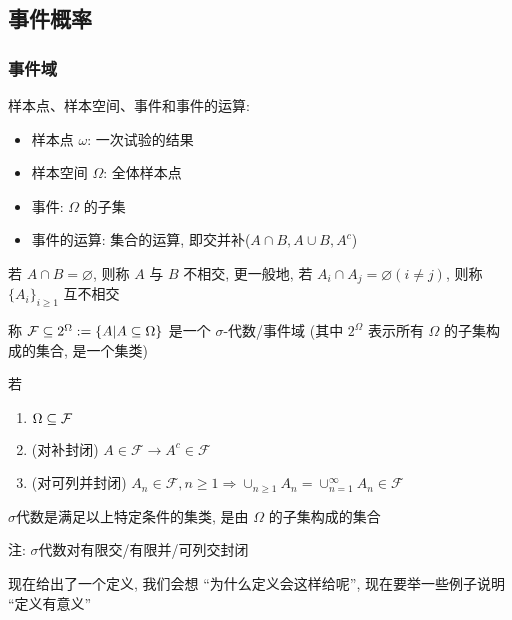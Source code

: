 \subsection{事件概率}

\subsubsection{事件域}

\begin{definition}[样本空间、事件]
    样本点、样本空间、事件和事件的运算: 
    \begin{itemize}
        \item 样本点 $\omega$:  一次试验的结果
        \item 样本空间 $\Omega$:  全体样本点
        \item 事件: $\Omega$ 的子集
        \item 事件的运算: 集合的运算, 即交并补($A\cap B, A\cup B, A^c$)
    \end{itemize}
\end{definition}

\begin{definition}
    若 $A\cap B=\varnothing$, 则称 $A$ 与 $B$ 不相交, 更一般地, 若 $A_i\cap A_j=\varnothing (i\neq j)$, 则称 $\{A_i\}_{i\geq 1}$ 互不相交
\end{definition}

\begin{definition}[$\sigma$-代数]
    称 $\mathcal{F}\subseteq 2^{\Omega}:=\{A|A\subseteq \Omega\}$ 是一个 $\sigma$-代数/事件域 (其中 $2^{\Omega}$ 表示所有 $\Omega$ 的子集构成的集合, 是一个集类) 

    若\begin{enumerate}
        \item $\Omega\subseteq \mathcal{F}$
        \item (对补封闭) $A\in \mathcal{F}\rightarrow A^c\in \mathcal{F}$
        \item (对可列并封闭) $A_n\in \mathcal{F}, n\geq 1\Rightarrow \cup_{n\geq 1}A_n=\cup_{n=1}^{\infty} A_n\in\mathcal{F}$
    \end{enumerate}

    $\sigma$代数是满足以上特定条件的集类, 是由 $\Omega$ 的子集构成的集合

    注: $\sigma$代数对有限交/有限并/可列交封闭
\end{definition}

现在给出了一个定义, 我们会想 “为什么定义会这样给呢”, 现在要举一些例子说明 “定义有意义”

